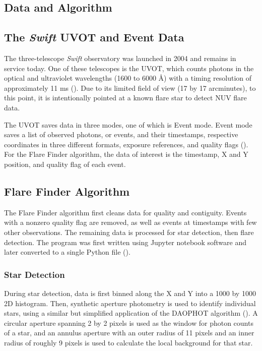 \documentclass{article}
\begin{document}
\begin{multicols}{2}
\section{Data and Algorithm}

\subsection{The \textit{Swift} UVOT and Event Data}

The three-telescope \textit{Swift} observatory was launched in 2004 and remains in service today. One of these telescopes is the UVOT, which counts photons in the optical and ultraviolet wavelengths (1600 to 6000 {\AA}) with a timing resolution of approximately 11 ms (\cite{nasaSwiftUVOT}). Due to its limited field of view (17 by 17 arcminutes), to this point, it is intentionally pointed at a known flare star to detect NUV flare data. 

The UVOT saves data in three modes, one of which is Event mode. Event mode saves a list of observed photons, or events, and their timestamps, respective coordinates in three different formats, exposure references, and quality flags (\cite{swiftGuide}). For the Flare Finder algorithm, the data of interest is the timestamp, X and Y position, and quality flag of each event. 

\subsection{Flare Finder Algorithm}

The Flare Finder algorithm first cleans data for quality and contiguity. Events with a nonzero quality flag are removed, as well as events at timestamps with few other observations. The remaining data is processed for star detection, then flare detection. The program was first written using Jupyter notebook software and later converted to a single Python file (\cite{jupyter}).

\subsubsection{Star Detection} \label{sss:starDetect}

During star detection, data is first binned along the X and Y into a 1000 by 1000 2D histogram. Then, synthetic aperture photometry is used to identify individual stars, using a similar but simplified application of the DAOPHOT algorithm (\cite{stetson}). A circular aperture spanning 2 by 2 pixels is used as the window for photon counts of a star, and an annulus aperture with an outer radius of 11 pixels and an inner radius of roughly 9 pixels is used to calculate the local background for that star. 


\end{multicols}
\end{document}
